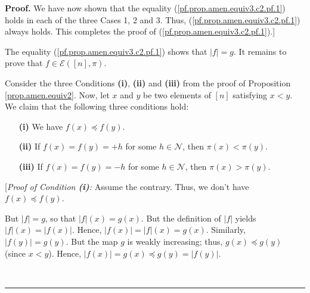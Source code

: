 \documentclass[numbers=enddot,12pt,final,onecolumn,notitlepage]{scrartcl}%
\theoremstyle{definition}
\newenvironment{proof}[1][Proof]{\noindent\textbf{#1.} }{\ \rule{0.5em}{0.5em}}
\newenvironment{verlong}{}{}
\begin{document}
\begin{verlong}
\begin{proof}
We have now shown that the equality (\ref{pf.prop.amen.equiv3.c2.pf.1}) holds
in each of the three Cases 1, 2 and 3. Thus,
(\ref{pf.prop.amen.equiv3.c2.pf.1}) always holds. This completes the proof of
(\ref{pf.prop.amen.equiv3.c2.pf.1}).]

The equality (\ref{pf.prop.amen.equiv3.c2.pf.1}) shows that $\left\vert
f\right\vert =g$. It remains to prove that $f\in\mathcal{E}\left(  \left[
n\right]  ,\pi\right)  $.

Consider the three Conditions \textbf{(i)}, \textbf{(ii)} and \textbf{(iii)}
from the proof of Proposition \ref{prop.amen.equiv2}. Now, let $x$ and $y$ be
two elements of $\left[  n\right]  $ satisfying $x<y$. We claim that the
following three conditions hold:

\begin{enumerate}
\item[\textbf{(i)}] We have $f\left(  x\right)  \preccurlyeq f\left(
y\right)  $.

\item[\textbf{(ii)}] If $f\left(  x\right)  =f\left(  y\right)  =+h$ for some
$h\in\mathcal{N}$, then $\pi\left(  x\right)  <\pi\left(  y\right)  $.

\item[\textbf{(iii)}] If $f\left(  x\right)  =f\left(  y\right)  =-h$ for some
$h\in\mathcal{N}$, then $\pi\left(  x\right)  >\pi\left(  y\right)  $.
\end{enumerate}

[\textit{Proof of Condition \textbf{(i)}:} Assume the contrary. Thus, we don't
have $f\left(  x\right)  \preccurlyeq f\left(  y\right)  $.

But $\left\vert f\right\vert =g$, so that $\left\vert f\right\vert \left(
x\right)  =g\left(  x\right)  $. But the definition of $\left\vert
f\right\vert $ yields $\left\vert f\right\vert \left(  x\right)  =\left\vert
f\left(  x\right)  \right\vert $. Hence, $\left\vert f\left(  x\right)
\right\vert =\left\vert f\right\vert \left(  x\right)  =g\left(  x\right)  $.
Similarly, $\left\vert f\left(  y\right)  \right\vert =g\left(  y\right)  $.
But the map $g$ is weakly increasing; thus, $g\left(  x\right)  \preccurlyeq
g\left(  y\right)  $ (since $x<y$). Hence, $\left\vert f\left(  x\right)
\right\vert =g\left(  x\right)  \preccurlyeq g\left(  y\right)  =\left\vert
f\left(  y\right)  \right\vert $.


\end{proof}
\end{verlong}
\end{document}
